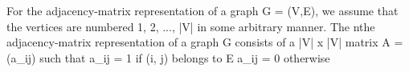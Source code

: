 \documentclass[preview]{standalone}
\begin{document}
\begin{center}
For the adjacency-matrix representation of a graph G = (V,E), we assume
that the vertices are numbered 1, 2, ..., |V| in some arbitrary manner. The nthe adjacency-matrix representation of a graph G consists of a |V| x |V| matrix
A = (a_ij) such that
a_ij = 1 if (i, j) belongs to E
a_ij = 0 otherwise
\end{center}
\end{document}
